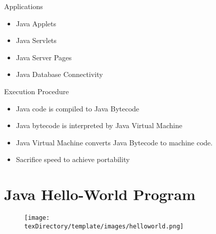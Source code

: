 \documentclass[10pt, compress]{beamer}
\begin{document}
\begin{slide}
	\begin{block}{Applications}
		\begin{itemize}
			\item[] Java Applets
			\item[] Java Servlets
			\item[] Java Server Pages
			\item[] Java Database Connectivity
		\end{itemize}
	\end{block}
\end{slide}

\begin{slide}
	\begin{block}{Execution Procedure}
		\begin{itemize}
			\item[] Java code is compiled to Java Bytecode
			\item[] Java bytecode is interpreted by Java Virtual Machine
			\item[] Java Virtual Machine converts Java Bytecode to machine code.
			\item[] Sacrifice speed to achieve portability
		\end{itemize}
	\end{block}
\end{slide}

\section{Java Hello-World Program}

\begin{slide}
	\begin{figure}
		\texttt{[image: \\texDirectory/template/images/helloworld.png]}
	\end{figure}
\end{slide}
\end{document}
